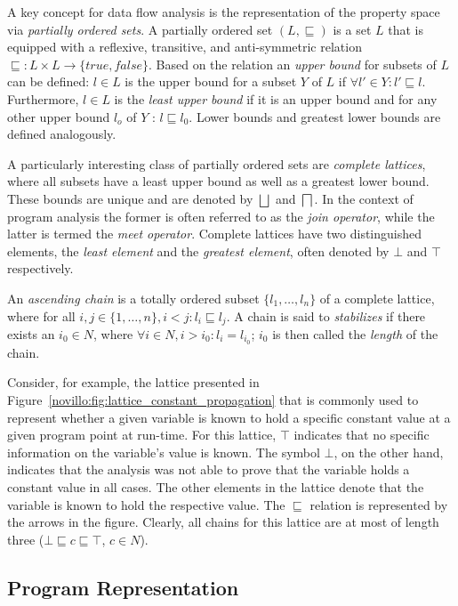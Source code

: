 A key concept for data flow analysis is the representation of the property
space via \emph{partially ordered sets}. A partially ordered set $(L,
\sqsubseteq)$ is a set $L$ that is equipped with a reflexive, transitive, and
anti-symmetric relation $\sqsubseteq: L \times L \rightarrow \{true, false\}$.
Based on the relation an \emph{upper bound} for subsets of $L$ can be defined:
$l \in L$ is the upper bound for a subset $Y$ of $L$ if $\forall l' \in Y: l'
\sqsubseteq l$. Furthermore, $l \in L$ is the \emph{least upper bound} if it is
an upper bound and for any other upper bound $l_o$ of $Y$ : $l \sqsubseteq l_0$.
Lower bounds and greatest lower bounds are defined analogously.

A particularly interesting class of partially ordered sets are \emph{complete
lattices}, where all subsets have a least upper bound as well as a greatest
lower bound. These bounds are unique and are denoted by $\bigsqcup$ and
$\bigsqcap$. In the context of program analysis the former is often referred to
as the \emph{join operator}, while the latter is termed the \emph{meet
operator}. Complete lattices have two distinguished elements, the \emph{least
element} and the \emph{greatest element}, often denoted by $\bot$ and $\top$
respectively.

An \emph{ascending chain} is a totally ordered subset $\{l_1, \ldots, l_n \}$ of
a complete lattice, where for all $i, j \in \{1, \ldots, n\}, i < j: l_i
\sqsubseteq l_j$. A chain is said to \emph{stabilizes} if there exists an $i_0
\in N$, where $\forall i \in N, i > i_0: l_i = l_{i_0}$; $i_0$ is then called
the \emph{length} of the chain.

Consider, for example, the lattice presented in
Figure~\ref{novillo:fig:lattice_constant_propagation} that is commonly used to
represent whether a given variable is known to hold a specific constant value at
a given program point at run-time. For this lattice, $\top$ indicates that no
specific information on the variable's value is known. The symbol $\bot$, on the
other hand, indicates that the analysis was not able to prove that the variable
holds a constant value in all cases. The other elements in the lattice denote
that the variable is known to hold the respective value. The $\sqsubseteq$
relation is represented by the arrows in the figure. Clearly, all chains for
this lattice are at most of length three ($\bot \sqsubseteq c \sqsubseteq \top$,
$c \in N$).

\subsection{Program Representation}

